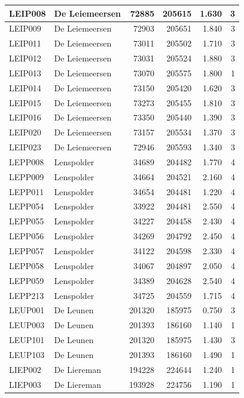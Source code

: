 \documentclass[11pt,]{book}
\begin{document}
\begin{table}
\begin{tabular}[t]{l|l|r|r|r|r}
LEIP008 & De Leiemeersen & 72885 & 205615 & 1.630 & 3\\
\hline
LEIP009 & De Leiemeersen & 72903 & 205651 & 1.840 & 3\\
\hline
LEIP011 & De Leiemeersen & 73011 & 205502 & 1.710 & 3\\
\hline
LEIP012 & De Leiemeersen & 73031 & 205524 & 1.880 & 3\\
\hline
LEIP013 & De Leiemeersen & 73070 & 205575 & 1.800 & 1\\
\hline
LEIP014 & De Leiemeersen & 73150 & 205420 & 1.620 & 3\\
\hline
LEIP015 & De Leiemeersen & 73273 & 205455 & 1.810 & 3\\
\hline
LEIP016 & De Leiemeersen & 73350 & 205440 & 1.390 & 3\\
\hline
LEIP020 & De Leiemeersen & 73157 & 205534 & 1.370 & 3\\
\hline
LEIP023 & De Leiemeersen & 72946 & 205593 & 1.340 & 3\\
\hline
LEPP008 & Lenspolder & 34689 & 204482 & 1.770 & 4\\
\hline
LEPP009 & Lenspolder & 34664 & 204521 & 2.160 & 4\\
\hline
LEPP011 & Lenspolder & 34654 & 204481 & 1.220 & 4\\
\hline
LEPP054 & Lenspolder & 33922 & 204481 & 2.550 & 4\\
\hline
LEPP055 & Lenspolder & 34227 & 204458 & 2.430 & 4\\
\hline
LEPP056 & Lenspolder & 34269 & 204792 & 2.450 & 4\\
\hline
LEPP057 & Lenspolder & 34122 & 204598 & 2.330 & 4\\
\hline
LEPP058 & Lenspolder & 34067 & 204897 & 2.050 & 4\\
\hline
LEPP059 & Lenspolder & 34389 & 204628 & 2.540 & 4\\
\hline
LEPP213 & Lenspolder & 34725 & 204559 & 1.715 & 4\\
\hline
LEUP001 & De Leunen & 201320 & 185975 & 0.750 & 3\\
\hline
LEUP003 & De Leunen & 201393 & 186160 & 1.140 & 1\\
\hline
LEUP101 & De Leunen & 201320 & 185975 & 1.430 & 3\\
\hline
LEUP103 & De Leunen & 201393 & 186160 & 1.490 & 1\\
\hline
LIEP002 & De Liereman & 194228 & 224644 & 1.240 & 1\\
\hline
LIEP003 & De Liereman & 193928 & 224756 & 1.190 & 1\\

\end{tabular}
\end{table}
\end{document}
